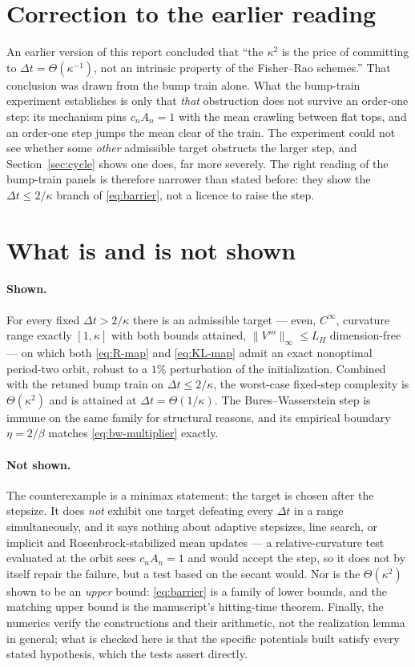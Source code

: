 \documentclass[11pt]{article}
\begin{document}
\section{Correction to the earlier reading}
\label{sec:correction}

An earlier version of this report concluded that ``the $\kappa^2$ is the price of
committing to $\Delta t=\Theta(\kappa^{-1})$, not an intrinsic property of the
Fisher--Rao schemes.'' That conclusion was drawn from the bump train alone. What the
bump-train experiment establishes is only that \emph{that} obstruction does not
survive an order-one step: its mechanism pins $c_nA_n=1$ with the mean crawling
between flat tops, and an order-one step jumps the mean clear of the train. The
experiment could not see whether some \emph{other} admissible target obstructs the
larger step, and Section~\ref{sec:cycle} shows one does, far more severely. The right reading
of the bump-train panels is therefore narrower than stated before: they show the
$\Delta t\le2/\kappa$ branch of \eqref{eq:barrier}, not a licence to raise the step.

\section{What is and is not shown}
\label{sec:scope}

\paragraph{Shown.} For every fixed $\Delta t>2/\kappa$ there is an admissible target
--- even, $C^\infty$, curvature range exactly $[1,\kappa]$ with both bounds attained,
$\|V'''\|_\infty\le L_H$ dimension-free --- on which both \eqref{eq:R-map} and
\eqref{eq:KL-map} admit an exact nonoptimal period-two orbit, robust to a $1\%$
perturbation of the initialization. Combined with the retuned bump train on
$\Delta t\le2/\kappa$, the worst-case fixed-step complexity is $\Theta(\kappa^2)$ and
is attained at $\Delta t=\Theta(1/\kappa)$. The Bures--Wasserstein step is immune on
the same family for structural reasons, and its empirical boundary $\eta=2/\beta$
matches \eqref{eq:bw-multiplier} exactly.

\paragraph{Not shown.} The counterexample is a minimax statement: the target is chosen
after the stepsize. It does \emph{not} exhibit one target defeating every
$\Delta t$ in a range simultaneously, and it says nothing about adaptive stepsizes, line
search, or implicit and Rosenbrock-stabilized mean updates --- a relative-curvature test
evaluated at the orbit sees $c_nA_n=1$ and would accept the step, so it does not by
itself repair the failure, but a test based on the secant would. Nor is the
$\Theta(\kappa^2)$ shown to be an \emph{upper} bound: \eqref{eq:barrier} is a family of
lower bounds, and the matching upper bound is the manuscript's hitting-time theorem.
Finally, the numerics verify the constructions and their arithmetic, not the
realization lemma in general; what is checked here is that the specific potentials
built satisfy every stated hypothesis, which the tests assert directly.
\end{document}
